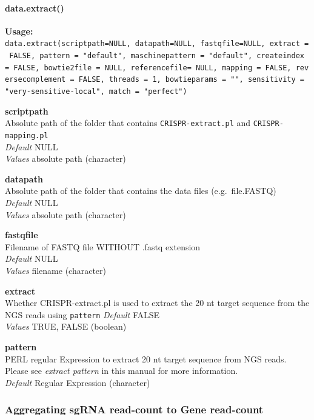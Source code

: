 \documentclass[]{article}
\let\oldparagraph\paragraph
\renewcommand{\paragraph}[1]{\oldparagraph{#1}\mbox{}}
\begin{document}
\paragraph{data.extract()}\label{data.extract}

\textbf{Usage:}\\
\texttt{data.extract(scriptpath=NULL,\ datapath=NULL,\ fastqfile=NULL,\ extract\ =\ FALSE,\ pattern\ =\ "default",\ maschinepattern\ =\ "default",\ createindex\ =\ FALSE,\ bowtie2file\ =\ NULL,\ referencefile=\ NULL,\ mapping\ =\ FALSE,\ reversecomplement\ =\ FALSE,\ threads\ =\ 1,\ bowtieparams\ =\ "",\ sensitivity\ =\ "very-sensitive-local",\ match\ =\ "perfect")}

\textbf{scriptpath}\\
Absolute path of the folder that contains \texttt{CRISPR-extract.pl} and
\texttt{CRISPR-mapping.pl}\\
\emph{Default} NULL\\
\emph{Values} absolute path (character)

\textbf{datapath}\\
Absolute path of the folder that contains the data files
(e.g.~file.FASTQ)\\
\emph{Default} NULL\\
\emph{Values} absolute path (character)

\textbf{fastqfile}\\
Filename of FASTQ file WITHOUT .fastq extension\\
\emph{Default} NULL\\
\emph{Values} filename (character)

\textbf{extract}\\
Whether CRISPR-extract.pl is used to extract the 20 nt target sequence
from the NGS reads using \texttt{pattern} \emph{Default} FALSE\\
\emph{Values} TRUE, FALSE (boolean)

\textbf{pattern}\\
PERL regular Expression to extract 20 nt target sequence from NGS reads.
Please see \emph{extract pattern} in this manual for more information.\\
\emph{Default} Regular Expression (character)

\subsubsection{Aggregating sgRNA read-count to Gene
read-count}\label{aggregating-sgrna-read-count-to-gene-read-count}
\end{document}
